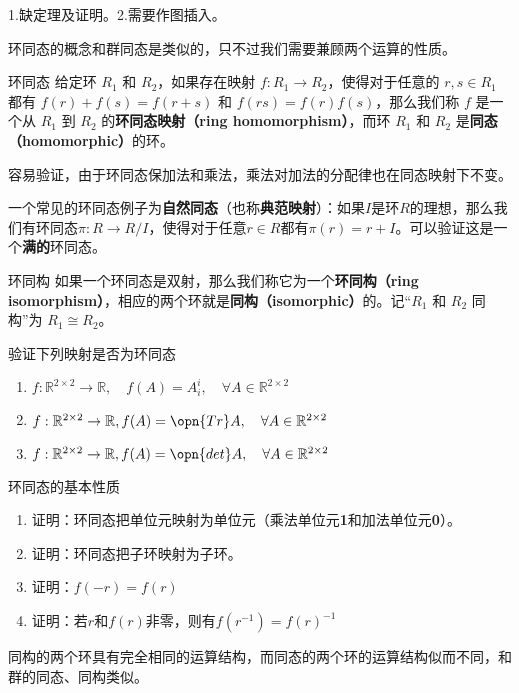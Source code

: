 
\begin{issues}
\issueDraft 
1.缺定理及证明。2.需要作图插入。
\end{issues}


环同态的概念和群同态是类似的，只不过我们需要兼顾两个运算的性质。


\begin{definition}{环同态}
给定环 $R_1$ 和 $R_2$，如果存在映射 $f:R_1\rightarrow R_2$，使得对于任意的 $r, s\in R_1$ 都有 $f(r)+f(s)=f(r+s)$ 和 $f(rs)=f(r)f(s)$，那么我们称 $f$ 是一个从 $R_1$ 到 $R_2$ 的\textbf{环同态映射（ring homomorphism）}，而环 $R_1$ 和 $R_2$ 是\textbf{同态（homomorphic）}的环。
\end{definition}
容易验证，由于环同态保加法和乘法，乘法对加法的分配律也在同态映射下不变。

一个常见的环同态例子为\textbf{自然同态}（也称\textbf{典范映射}）：如果$I$是环$R$的理想，那么我们有环同态$\pi:R\rightarrow R/I$，使得对于任意$r\in R$都有$\pi (r)=r+I$。可以验证这是一个\textbf{满的}环同态。
\begin{definition}{环同构}
如果一个环同态是双射，那么我们称它为一个\textbf{环同构（ring isomorphism）}，相应的两个环就是\textbf{同构（isomorphic）}的。记“$R_1$ 和 $R_2$ 同构”为 $R_1\cong R_2$。
\end{definition}
\begin{exercise}{验证下列映射是否为环同态}
\begin{enumerate}
\item $f:\mathbb R^{2\times 2}\rightarrow \mathbb R,\quad f(A)=A^i_i,\quad \forall A\in \mathbb R^{2\times 2}$
\item $f:\mathbb R^{2\times 2}\rightarrow \mathbb R,f(A)=\opn {Tr}A,\quad \forall A\in \mathbb R^{2\times 2}$
\item $f:\mathbb R^{2\times 2}\rightarrow \mathbb R,f(A)=\opn {det}A,\quad \forall A\in \mathbb R^{2\times 2}$
\end{enumerate}
\end{exercise}
\begin{exercise}{环同态的基本性质}
\begin{enumerate}
\item 证明：环同态把单位元映射为单位元（乘法单位元\textbf{1}和加法单位元\textbf{0}）。
\item 证明：环同态把子环映射为子环。
\item 证明：$f(-r)=f(r)$
\item 证明：若$r$和$f(r)$非零，则有$f(r^{-1})=f(r)^{-1}$
\end{enumerate}
\end{exercise}
同构的两个环具有完全相同的运算结构，而同态的两个环的运算结构似而不同，和群的同态、同构类似。

